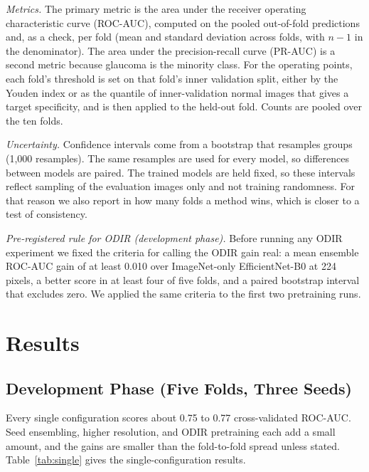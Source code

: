 \textit{Metrics.} The primary metric is the area under the receiver operating characteristic curve (ROC-AUC), computed on the pooled out-of-fold predictions and, as a check, per fold (mean and standard deviation across folds, with $n-1$ in the denominator). The area under the precision-recall curve (PR-AUC) is a second metric because glaucoma is the minority class. For the operating points, each fold's threshold is set on that fold's inner validation split, either by the Youden index or as the quantile of inner-validation normal images that gives a target specificity, and is then applied to the held-out fold. Counts are pooled over the ten folds.

\textit{Uncertainty.} Confidence intervals come from a bootstrap that resamples groups (1,000 resamples). The same resamples are used for every model, so differences between models are paired. The trained models are held fixed, so these intervals reflect sampling of the evaluation images only and not training randomness. For that reason we also report in how many folds a method wins, which is closer to a test of consistency.

\textit{Pre-registered rule for ODIR (development phase).} Before running any ODIR experiment we fixed the criteria for calling the ODIR gain real: a mean ensemble ROC-AUC gain of at least 0.010 over ImageNet-only EfficientNet-B0 at 224 pixels, a better score in at least four of five folds, and a paired bootstrap interval that excludes zero. We applied the same criteria to the first two pretraining runs.

\section{Results}
\label{sec:results}
\subsection{Development Phase (Five Folds, Three Seeds)}
Every single configuration scores about 0.75 to 0.77 cross-validated ROC-AUC. Seed ensembling, higher resolution, and ODIR pretraining each add a small amount, and the gains are smaller than the fold-to-fold spread unless stated. Table~\ref{tab:single} gives the single-configuration results.

